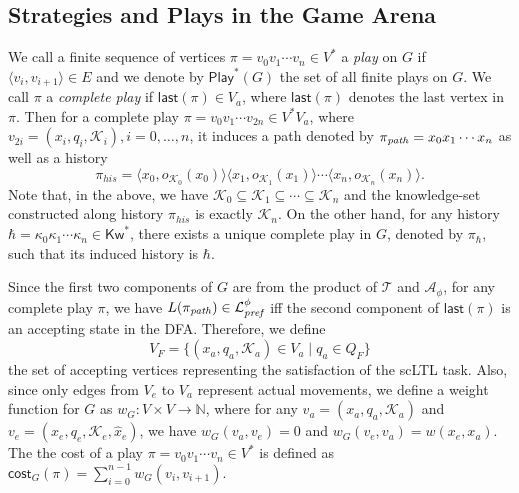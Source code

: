 \documentclass{ifacconf}
\def \A{\mathcal{A}}
\def \L{\mathcal{L}}
\def \K{\mathcal{K}}
\def \<{\langle}
\def \>{\rangle}
\def \pref{\emph{\text{pref}}}
\def \kw{\textsf{Kw}}
\def \cost{\textsf{cost}}
\begin{document}
\subsection{Strategies and Plays in the Game Arena}
 We call  a finite sequence of vertices 
$\pi=v_0v_1\cdots v_n\in V^*$ a \emph{play} on $G$ if $\< v_i,v_{i+1} \>\!\in\! E$ and we denote by $\textsf{Play}^*(G)$ the set of all finite plays on $G$.
We call $\pi$ a \emph{complete  play} if $\textsf{last}(\pi)\in V_a$, where $\textsf{last}(\pi)$ denotes the last vertex in  $\pi$.  Then for a  complete play 
$\pi=v_0v_1\cdots v_{2n}\in V^*V_a$, 
where $v_{2i}=(x_i, q_i, \K_i ), i=0,\dots, n$, it  induces a path denoted by 
$\pi_{\text{\emph{path}}}= x_0 x_1\cdots x_{n}$ as well as a history 
\begin{equation}
    \pi_{his}= \<x_0, o_{\K_0}(x_0)\>\<x_1, o_{\K_1}(x_1)\> \cdots 
    \<x_{n}, o_{\K_{n}}(x_{n})\>.   \nonumber
\end{equation}
Note that, in the above, we have $\K_0\subseteq \K_1\subseteq\cdots\subseteq \K_n$ 
and the knowledge-set constructed along history $\pi_{his}$ is exactly $\K_n$. 
On the other hand, for any history 
$\hbar= \kappa_0\kappa_1\cdots\kappa_n\in \kw^*$, there exists a unique complete play in $G$, denoted by $\pi_{\hbar}$,  
such that  its induced history   is $\hbar$.


Since the first two components of $G$ are from the product of $\mathcal{T}$ and $\A_\phi$, 
for any complete play $\pi$, we have $L(\pi_{\text{\emph{path}}})\in \L_{\pref}^\phi$ iff the second component of $\textsf{last}(\pi)$ is an accepting state in the DFA. Therefore, we define 
\begin{equation}
V_F=\{ (x_a,q_a,\K_a)\in V_a \mid q_a\in Q_F \}\nonumber
\end{equation}
the set of accepting vertices representing the satisfaction of the scLTL task. Also, since only  edges from $V_e$ to $V_a$ represent   actual movements, we   define a weight function for $G$ as 
$w_G\!:\!V\!\times\! V\!\to\! \mathbb{N}$, 
where for any $v_a\!=\!(x_a,q_a,\K_a)$ and $v_e\!=\!(x_e,q_e,\K_e, \hat{x}_e)$, 
we have $w_G(v_a,v_e)\!=\!0$ and $w_G(v_e,v_a)\!=\!w(x_e,x_a)$. 
The the cost of a play  $\pi\!=\!v_0v_1\cdots v_n\!\in\! V^*$ is defined as 
  $\cost_G(\pi)\!=\!\sum_{i=0}^{n-1}w_G ( v_i,v_{i+1} )$.
\end{document}
